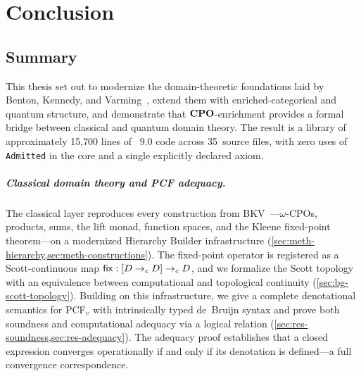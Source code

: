 
\chapter{Conclusion}
\label{ch:conclusion}

\section{Summary}
\label{sec:conc-summary}

This thesis set out to modernize the domain-theoretic foundations
laid by Benton, Kennedy, and Varming~\cite{BKV2009}, extend them
with enriched-categorical and quantum structure, and demonstrate
that $\mathbf{CPO}$-enrichment provides a formal bridge between classical
and quantum domain theory.
The result is a library of approximately 15{,}700 lines of
\Rocq{}~9.0 code across 35~source files, with zero uses of
\texttt{Admitted} in the core and a single explicitly declared axiom.

\paragraph{Classical domain theory and PCF adequacy.}
The classical layer reproduces every construction from
BKV~\cite{BKV2009}---$\omega$-CPOs, products, sums, the lift monad,
function spaces, and the Kleene fixed-point theorem---on a
modernized Hierarchy Builder infrastructure
(\cref{sec:meth-hierarchy,sec:meth-constructions}).
The fixed-point operator is registered as a Scott-continuous map
$\mathsf{fix} : [D \to_c D] \to_c D$, and we formalize the Scott topology
with an equivalence between computational and topological continuity
(\cref{sec:bg-scott-topology}).
Building on this infrastructure, we give a complete denotational
semantics for PCF$_v$ with intrinsically typed de~Bruijn syntax and
prove both soundness and computational adequacy via a logical
relation (\cref{sec:res-soundness,sec:res-adequacy}).
The adequacy proof establishes that a closed expression converges
operationally if and only if its denotation is defined---a
full convergence correspondence.

